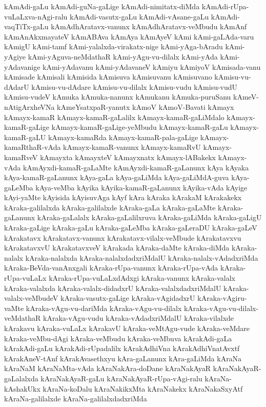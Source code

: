 {kAmAdi-gaLu
kAmAdi-guNa-gaLige
kAmAdi-nimitatx-diMda
kAmAdi-rUpa-vuLaLxva-nAgi-ralu
kAmAdi-vasutx-gaLu
kAmAdi-vAsane-gaLu
kAmAdi-vaqTiTx-gaLu
kAmAdhAratavx-vanunx
kAmAdhAratavx-veMbudu
kAmAnf
kAmAnAkxmayateV
kAmABAva
kAmAya
kAmAyeV
kAmi
kAmi-gaLAda-varu
kAmigU
kAmi-tamf
kAmi-yalalxda-virakatx-nige
kAmi-yAga-bAradu
kAmi-yAgiye
kAmi-yAguva-neMdathaR
kAmi-yAgu-vu-dilalx
kAmi-yAda
kAmi-yAdavanige
kAmi-yAdavanu
kAmi-yAdavaneV
kAmiyu
kAmiyoV
kAmisada-vanu
kAmisade
kAmisali
kAmisida
kAmisuva
kAmisuvanu
kAmisuvano
kAmisu-vu-dAdarU
kAmisu-vu-dAdare
kAmisu-vu-dilalx
kAmisu-vudu
kAmisu-vudU
kAmisu-vudeV
kAmuka
kAmuka-nanunx
kAmukanu
kAmuka-puruSanu
kAmeV-nAtigArxheVNa
kAmeYsatxpaR-yanutx
kAmoV
kAmoV-Bavati
kAmayx
kAmayx-kamaR
kAmayx-kamaR-gaLalilx
kAmayx-kamaR-gaLiMdalo
kAmayx-kamaR-gaLige
kAmayx-kamaR-gaLige-yeMbudu
kAmayx-kamaR-gaLu
kAmayx-kamaR-gaLU
kAmayx-kamaRda
kAmayx-kamaR-pala-gaLige
kAmayx-kamaRthaR-vAda
kAmayx-kamaR-vanunx
kAmayx-kamaRvU
kAmayx-kamaRveV
kAmayxta
kAmayxteV
kAmayxnatx
kAmayx-lABakekx
kAmayx-vAda
kAmAyxdi-kamaR-gaLaMte
kAmAyxdi-kamaR-gaLanunx
kAya
kAyaka
kAya-kamaR-gaLanunx
kAya-gaLa
kAya-gaLiMda
kAya-gaLiMdA-guva
kAya-gaLeMba
kAya-veMba
kAyika
kAyika-kamaR-gaLanunx
kAyika-vAda
kAyige
kAyi-yaMte
kAyisida
kAyisuvAga
kAyf
kAra
kAraka
kArakaM
kArakakekx
kAraka-galilalxda
kAraka-galilalxde
kAraka-gaLa
kAraka-gaLaMte
kAraka-gaLanunx
kAraka-gaLalalx
kAraka-gaLalilxruva
kAraka-gaLiMda
kAraka-gaLigU
kAraka-gaLige
kAraka-gaLu
kAraka-gaLeMba
kAraka-gaLeraDU
kAraka-gaLeV
kArakatavx
kArakatavx-vanunx
kArakatavx-vilalx-veMbude
kArakatavxvu
kArakatavxvU
kArakatavxveV
kArakada
kAraka-daMte
kAraka-diMda
kAraka-nalalx
kAraka-nalalxda
kAraka-nalalxdadxriMdalU
kAraka-nalalx-vAdadxriMda
kAraka-BeVda-vanAnxgali
kAraka-rUpa-vanunx
kAraka-rUpa-vAda
kAraka-rUpa-vuLaLx
kAraka-rUpa-vuLaLxdAdxgi
kAraka-vanunx
kAraka-valalx
kAraka-valalxda
kAraka-valalx-didadxrU
kAraka-valalxdadxriMdalU
kAraka-valalx-veMbudeV
kAraka-vasutx-gaLige
kAraka-vAgidadxrU
kAraka-vAgiru-vaMte
kAraka-vAgu-vu-dariMda
kAraka-vAgu-vu-dilalx
kAraka-vAgu-vu-dilalx-veMdathaR
kAraka-vAgu-vudu
kAraka-vAdadxriMdalU
kAraka-vilalxde
kArakavu
kAraka-vuLaLx
kArakavU
kAraka-veMtAgu-vude
kAraka-veMdare
kAraka-veMbu-dAgi
kAraka-veMbudu
kAraka-veMbuva
kArakAdi-gaLa
kArakAdi-gaLu
kArakAdi-rUpadalilx
kArakAdhiVna
kArakAdhiVnatAvxtf
kArakAneV-tAnf
kArakAvasethxyu
kAra-gaLanunx
kAra-gaLiMda
kAraNa
kAraNaM
kAraNaMta-vAda
kAraNakAra-doDane
kAraNakAyaR
kAraNakAyaR-gaLalalxda
kAraNakAyaR-gaLu
kAraNakAyaR-rUpa-vAgi-ralu
kAraNa-kAshakUkx
kAraNa-koDalu
kAraNakikxMta
kAraNakekx
kAraNakaSxyAtf
kAraNa-galilalxde
kAraNa-galilalxdadxriMda
}
